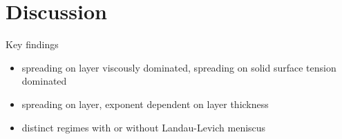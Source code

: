 \documentclass[aip,graphicx]{revtex4-1}
\begin{document}
\section{Discussion}

Key findings

\begin{itemize}
 \item spreading on layer viscously dominated, spreading on solid
   surface tension dominated
 \item spreading on layer, exponent dependent on layer thickness
 \item distinct regimes with or without Landau-Levich meniscus
\end{itemize}



%
%

%



\end{document}
